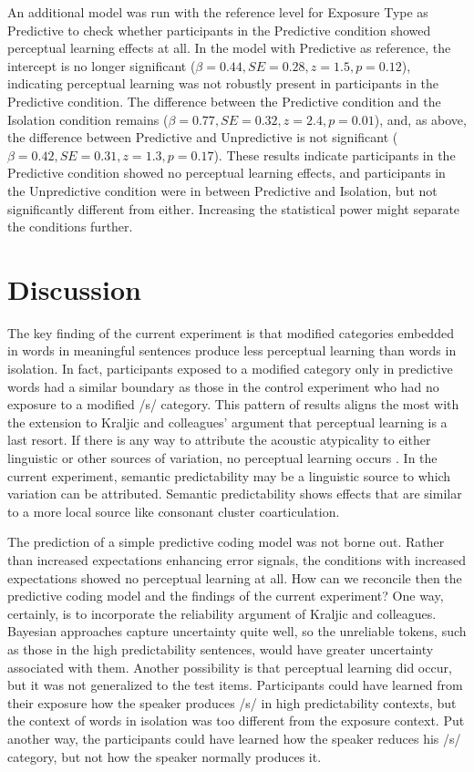 An additional model was run with the reference level for Exposure Type as Predictive to check whether participants in the Predictive condition showed perceptual learning effects at all.
In the model with Predictive as reference, the intercept is no longer significant ($\beta = 0.44, SE = 0.28, z = 1.5, p = 0.12$), indicating perceptual learning was not robustly present in participants in the Predictive condition.  
The difference between the Predictive condition and the Isolation condition remains ($\beta = 0.77, SE = 0.32, z = 2.4, p = 0.01$), and, as above, the difference between Predictive and Unpredictive is not significant ($\beta = 0.42, SE = 0.31, z = 1.3, p = 0.17$).
These results indicate participants in the Predictive condition showed no perceptual learning effects, and participants in the Unpredictive condition were in between Predictive and Isolation, but not significantly different from either.  
Increasing the statistical power might separate the conditions further.


\section{Discussion}

The key finding of the current experiment is that modified categories embedded in words in meaningful sentences produce less perceptual learning than words in isolation.  
In fact, participants exposed to a modified category only in predictive words had a similar boundary as those in the control experiment who had no exposure to a modified /s/ category.
This pattern of results aligns the most with the extension to Kraljic and colleagues' argument that perceptual learning is a last resort.
If there is any way to attribute the acoustic atypicality to either linguistic or other sources of variation, no perceptual learning occurs \citep{Kraljic2008,Kraljic2008a}.
In the current experiment, semantic predictability may be a linguistic source to which variation can be attributed.
Semantic predictability shows effects that are similar to a more local source like consonant cluster coarticulation.

The prediction of a simple predictive coding model \citep{Clark2013} was not borne out.
Rather than increased expectations enhancing error signals, the conditions with increased expectations showed no perceptual learning at all.
How can we reconcile then the predictive coding model and the findings of the current experiment?
One way, certainly, is to incorporate the reliability argument of Kraljic and colleagues.
Bayesian approaches capture uncertainty quite well, so the unreliable tokens, such as those in the high predictability sentences, would have greater uncertainty associated with them.
Another possibility is that perceptual learning did occur, but it was not generalized to the test items.
Participants could have learned from their exposure how the speaker produces /s/ in high predictability contexts, but the context of words in isolation was too different from the exposure context.
Put another way, the participants could have learned how the speaker reduces his /s/ category, but not how the speaker normally produces it.

